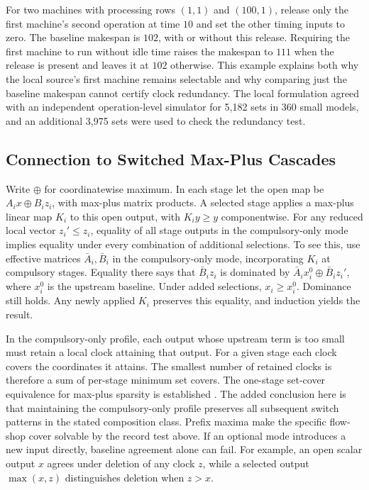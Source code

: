 \documentclass[11pt,letterpaper]{article}
\begin{document}
For two machines with processing rows $(1,1)$ and $(100,1)$, release only the first machine's second operation at time $10$ and set the other timing inputs to zero. The baseline makespan is $102$, with or without this release. Requiring the first machine to run without idle time raises the makespan to $111$ when the release is present and leaves it at $102$ otherwise. This example explains both why the local source's first machine remains selectable and why comparing just the baseline makespan cannot certify clock redundancy. The local formulation agreed with an independent operation-level simulator for 5,182 sets in 360 small models, and an additional 3,975 sets were used to check the redundancy test.

\subsection{Connection to Switched Max-Plus Cascades}

Write $\oplus$ for coordinatewise maximum. In each stage let the open map be $A_i x\oplus B_i z_i$, with max-plus matrix products. A selected stage applies a max-plus linear map $K_i$ to this open output, with $K_i y\ge y$ componentwise. For any reduced local vector $z_i'\le z_i$, equality of all stage outputs in the compulsory-only mode implies equality under every combination of additional selections. To see this, use effective matrices $\bar A_i,\bar B_i$ in the compulsory-only mode, incorporating $K_i$ at compulsory stages. Equality there says that $\bar B_i z_i$ is dominated by $\bar A_i x_i^0\oplus\bar B_i z_i'$, where $x_i^0$ is the upstream baseline. Under added selections, $x_i\ge x_i^0$. Dominance still holds. Any newly applied $K_i$ preserves this equality, and induction yields the result.

In the compulsory-only profile, each output whose upstream term is too small must retain a local clock attaining that output. For a given stage each clock covers the coordinates it attains. The smallest number of retained clocks is therefore a sum of per-stage minimum set covers. The one-stage set-cover equivalence for max-plus sparsity is established \citep[][Theorem~1]{Tsiamis2018}. The added conclusion here is that maintaining the compulsory-only profile preserves all subsequent switch patterns in the stated composition class. Prefix maxima make the specific flow-shop cover solvable by the record test above. If an optional mode introduces a new input directly, baseline agreement alone can fail. For example, an open scalar output $x$ agrees under deletion of any clock $z$, while a selected output $\max(x,z)$ distinguishes deletion when $z>x$.
\end{document}
